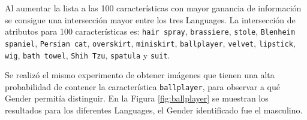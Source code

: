 \documentclass[runningheads]{llncs}
\begin{document}
Al aumentar la lista a las 100 características con mayor ganancia de información
se consigue una intersección mayor entre los tres Languages. La intersección
de atributos para 100 características es: \texttt{hair spray}, \texttt{brassiere}, \texttt{stole}, \texttt{Blenheim spaniel}, \texttt{Persian cat}, \texttt{overskirt}, \texttt{miniskirt}, \texttt{ballplayer}, \texttt{velvet}, \texttt{lipstick}, \texttt{wig}, \texttt{bath towel}, \texttt{Shih Tzu}, \texttt{spatula} y \texttt{suit}.

Se realizó el mismo experimento de obtener imágenes que tienen una alta 
probabilidad de contener la característica \texttt{ballplayer}, para
observar a qué Gender permitía distinguir. En la Figura \ref{fig:ballplayer}
se muestran los resultados para los diferentes Languages, el Gender identificado
fue el masculino.
\end{document}
